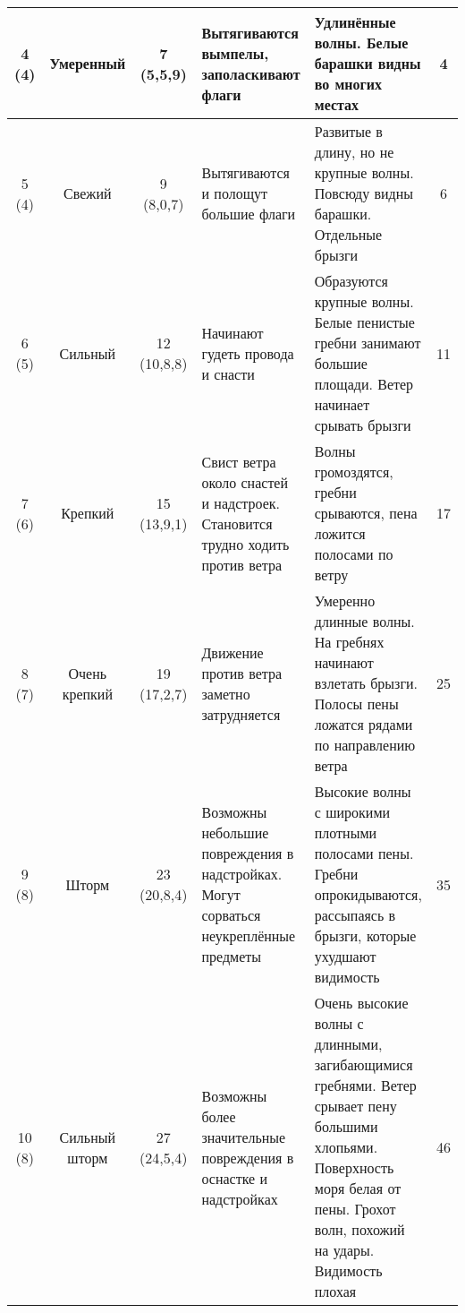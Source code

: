 {\begin{longtable}{c|c|c|p{}|p{}|c}
    \midrule
    \shortstack{4\\(4)} & Умеренный & \shortstack{7\\(5,5\otdo 7,9)} & Вытягиваются вымпелы, заполаскивают флаги & Удлинённые волны. Белые барашки видны во многих местах & 4 \\
    \midrule
    \shortstack{5\\(4)} & Свежий & \shortstack{9\\(8,0\otdo 10,7)} & Вытягиваются и полощут большие флаги & Развитые в длину, но не крупные волны. Повсюду видны барашки. Отдельные брызги & 6 \\
    \midrule
    \shortstack{6\\(5)} & Сильный & \shortstack{12\\(10,8\otdo 13,8)} & Начинают гудеть провода и снасти & Образуются крупные волны. Белые пенистые гребни занимают большие площади. Ветер начинает срывать брызги & 11 \\
    \midrule
    \shortstack{7\\(6)} & Крепкий & \shortstack{15\\(13,9\otdo 17,1)} & Свист ветра около снастей и надстроек. Становится трудно ходить против ветра & Волны громоздятся, гребни срываются, пена ложится полосами по ветру & 17 \\
    \midrule
    \shortstack{8\\(7)} & \shortstack{Очень\\крепкий} & \shortstack{19\\(17,2\otdo 20,7)} & Движение против ветра заметно затрудняется & Умеренно длинные волны. На гребнях начинают взлетать брызги. Полосы пены ложатся рядами по направлению ветра & 25 \\
    \midrule
    \shortstack{9\\(8)} & Шторм & \shortstack{23\\(20,8\otdo 24,4)} & Возможны небольшие повреждения в надстройках. Могут сорваться неукреплённые предметы & Высокие волны с широкими плотными полосами пены. Гребни опрокидываются, рассыпаясь в брызги, которые ухудшают видимость & 35 \\
    \midrule
    \shortstack{10\\(8)} & \shortstack{Сильный\\шторм} & \shortstack{27\\(24,5\otdo 28,4)} & Возможны более значительные повреждения в оснастке и надстройках & Очень высокие волны с длинными, загибающимися гребнями. Ветер срывает пену большими хлопьями. Поверхность моря белая от пены. Грохот волн, похожий на удары. Видимость плохая & 46 \\

\end{longtable}}
